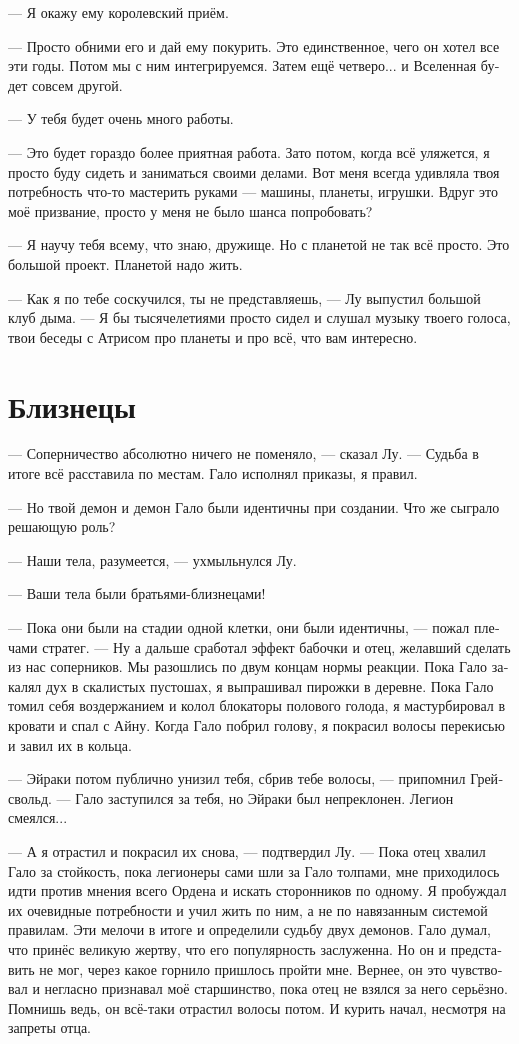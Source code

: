 \documentclass[a4paper,12pt,fleqn]{book}\usepackage{cooltooltips}\usepackage{polyglossia}\setdefaultlanguage[babelshorthands=true]{russian}\setotherlanguage{english}\defaultfontfeatures{Ligatures=TeX,Mapping=tex-text} \usepackage{xcolor}\definecolor{lightgray}{HTML}{bbbbbb}\color{lightgray}\newcommand{\ml}[3]{\textenglish{\textcolor{black}{#3}}}
\begin{document}
{--- Я окажу ему королевский приём.

--- Просто обними его и дай ему покурить.
Это единственное, чего он хотел все эти годы.
Потом мы с ним интегрируемся.
Затем ещё четверо... и Вселенная будет совсем другой.

--- У тебя будет очень много работы.

--- Это будет гораздо более приятная работа.
Зато потом, когда всё уляжется, я просто буду сидеть и заниматься своими делами.
Вот меня всегда удивляла твоя потребность что-то мастерить руками --- машины, планеты, игрушки.
Вдруг это моё призвание, просто у меня не было шанса попробовать?

--- Я научу тебя всему, что знаю, дружище.
Но с планетой не так всё просто.
Это большой проект.
Планетой надо жить.

--- Как я по тебе соскучился, ты не представляешь, --- Лу выпустил большой клуб дыма.
--- Я бы тысячелетиями просто сидел и слушал музыку твоего голоса, твои беседы с Атрисом про планеты и про всё, что вам интересно.

\section{Близнецы}

--- Соперничество абсолютно ничего не поменяло, --- сказал Лу.
--- Судьба в итоге всё расставила по местам.
Гало исполнял приказы, я правил.

--- Но твой демон и демон Гало были идентичны при создании.
Что же сыграло решающую роль?

--- Наши тела, разумеется, --- ухмыльнулся Лу.

--- Ваши тела были братьями-близнецами!

--- Пока они были на стадии одной клетки, они были идентичны, --- пожал плечами стратег.
--- Ну а дальше сработал эффект бабочки и отец, желавший сделать из нас соперников.
Мы разошлись по двум концам нормы реакции.
Пока Гало закалял дух в скалистых пустошах, я выпрашивал пирожки в деревне.
Пока Гало томил себя воздержанием и колол блокаторы полового голода, я мастурбировал в кровати и спал с Айну.
Когда Гало побрил голову, я покрасил волосы перекисью и завил их в кольца.

--- Эйраки потом публично унизил тебя, сбрив тебе волосы, --- припомнил Грейсвольд.
--- Гало заступился за тебя, но Эйраки был непреклонен.
Легион смеялся...

--- А я отрастил и покрасил их снова, --- подтвердил Лу.
--- Пока отец хвалил Гало за стойкость, пока легионеры сами шли за Гало толпами, мне приходилось идти против мнения всего Ордена и искать сторонников по одному.
Я пробуждал их очевидные потребности и учил жить по ним, а не по навязанным системой правилам.
Эти мелочи в итоге и определили судьбу двух демонов.
Гало думал, что принёс великую жертву, что его популярность заслуженна.
Но он и представить не мог, через какое горнило пришлось пройти мне.
Вернее, он это чувствовал и негласно признавал моё старшинство, пока отец не взялся за него серьёзно.
Помнишь ведь, он всё-таки отрастил волосы потом.
И курить начал, несмотря на запреты отца.

}
\end{document}
